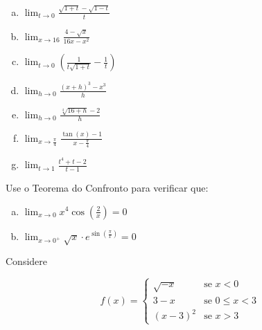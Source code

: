 \documentclass[12pt]{exam}
\newcommand{\euler}{e}
\begin{document}
\begin{questions}
    \begin{multicols}{3}
        \begin{enumerate}[(a)]
            \item 
            $\displaystyle \lim_{t\to 0} \frac{\sqrt{1 + t} - \sqrt{1 - t}}{t} $
            \item 
            $\displaystyle \lim_{x\to 16} \frac{4 - \sqrt{x} }{16x - x^2} $
            \item 
            $\displaystyle  \lim_{t\to 0} \left( \frac{1}{t\sqrt{1 + t}} - \frac{1}{t} \right) $
            \item 
            $\displaystyle \lim_{h\to 0} \frac{ \left( x + h\right)^3 - x^3 }{h} $
            \item 
            $\displaystyle \lim_{h\to 0} \frac{\sqrt[4]{16 + h} - 2}{h} $
            \item 
            $\displaystyle \lim_{x\to \frac{\pi}{4}} \frac{\tan{\left(x\right)} - 1}{x - \frac{\pi}{4}} $
            \item 
            $\displaystyle \lim_{t\to 1} \frac{t^4 + t - 2}{t - 1} $
        \end{enumerate}
    \end{multicols}

\question Use o Teorema do Confronto para verificar que:

    \begin{multicols}{2}
        \begin{enumerate}[(a)]
            \item 
            $\displaystyle \lim_{x\to 0} x^4 \cos{\left( \frac{2}{x} \right) } = 0 $
            \item 
            $\displaystyle \lim_{x\to 0^+} \sqrt{x} \cdot \euler^{\sin{\left( \frac{\pi}{x} \right) }  } = 0 $
        \end{enumerate}
    \end{multicols}
    

\question Considere

\begin{equation}
    f(x) = \begin{cases}
        \sqrt{-x} & \text{se    }  x < 0 \\
        3 - x & \text{se    } 0 \leq x < 3 \\
        \left( x - 3 \right) ^2 & \text{se  } x > 3



    \end{cases}
\end{equation}


\end{questions}
\end{document}
